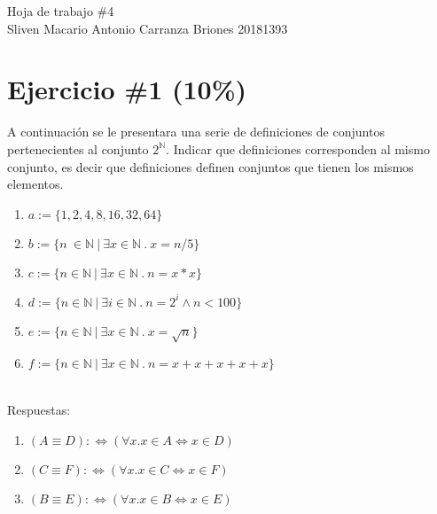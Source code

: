 \documentclass[10pt,a4paper]{article}
\author{Sliven Carranza}
\begin{document}
\begin{center}
        \huge{Hoja de trabajo \#4} \\
        \large{Sliven Macario Antonio Carranza Briones 20181393} \\
\end{center}
 \section*{Ejercicio \#1 (10\%)}
A continuaci\'on se le presentara una serie de definiciones de conjuntos pertenecientes al
conjunto $2^{\mathbb{N}}$. Indicar que definiciones corresponden al mismo conjunto, es decir
que definiciones definen conjuntos que tienen los mismos elementos.
\begin{enumerate}
        \item{$a:=\{1,2,4,8,16,32,64\}$}
        \item{$b:=\{n\ \in \mathbb{N}\ |\ \exists x \in \mathbb{N}\ .\ x=n/5 \}$}
        \item{$c:=\{n\in \mathbb{N}\ |\ \exists x\in\mathbb{N}\ .\ n=x*x \}$}
        \item{$d:=\{n\in\mathbb{N}\ |\ \exists i\in\mathbb{N}\ .\ n=2^i\wedge n<100 \}$}
        \item{$e:=\{ n\in\mathbb{N}\ |\ \exists x\in \mathbb{N}\ .\ x=\sqrt{n} \}$}
        \item{$f:=\{ n\in\mathbb{N}\ |\ \exists x\in \mathbb{N}\ .\ n=x+x+x+x+x \}$} \\ \\
\end{enumerate} 
Respuestas: 
\begin{enumerate}
 \item{$(A\equiv D):\Leftrightarrow ( \forall x.x\in A\Leftrightarrow x \in D)$}
 \item{$(C\equiv F):\Leftrightarrow ( \forall x.x\in C\Leftrightarrow x \in F)$}
  \item{$(B\equiv E):\Leftrightarrow ( \forall x.x\in B\Leftrightarrow x \in E)$}
  
\end{enumerate}
\end{document}
